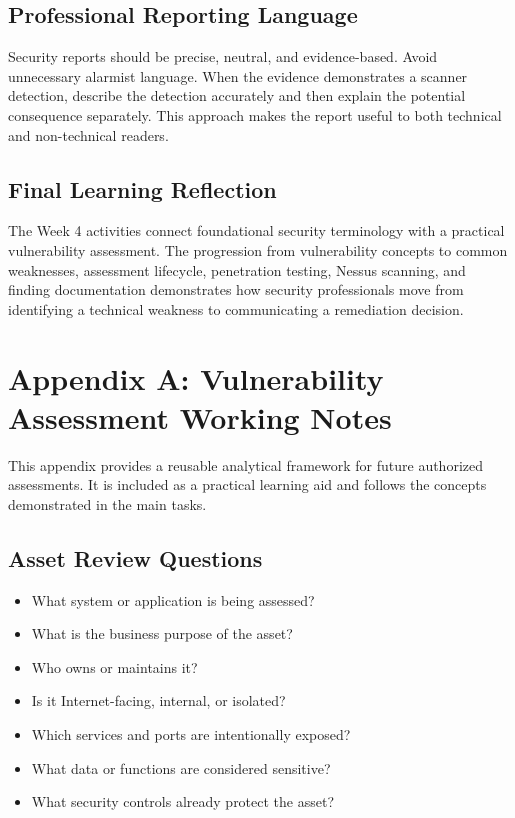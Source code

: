 \documentclass[11pt,a4paper]{article}
\begin{document}
\subsection{Professional Reporting Language}
Security reports should be precise, neutral, and evidence-based. Avoid unnecessary alarmist language. When the evidence demonstrates a scanner detection, describe the detection accurately and then explain the potential consequence separately. This approach makes the report useful to both technical and non-technical readers.

\subsection{Final Learning Reflection}
The Week 4 activities connect foundational security terminology with a practical vulnerability assessment. The progression from vulnerability concepts to common weaknesses, assessment lifecycle, penetration testing, Nessus scanning, and finding documentation demonstrates how security professionals move from identifying a technical weakness to communicating a remediation decision.


\newpage
\section{Appendix A: Vulnerability Assessment Working Notes}
This appendix provides a reusable analytical framework for future authorized assessments. It is included as a practical learning aid and follows the concepts demonstrated in the main tasks.

\subsection{Asset Review Questions}
\begin{itemize}
\item What system or application is being assessed?
\item What is the business purpose of the asset?
\item Who owns or maintains it?
\item Is it Internet-facing, internal, or isolated?
\item Which services and ports are intentionally exposed?
\item What data or functions are considered sensitive?
\item What security controls already protect the asset?
\end{itemize}
\end{document}
